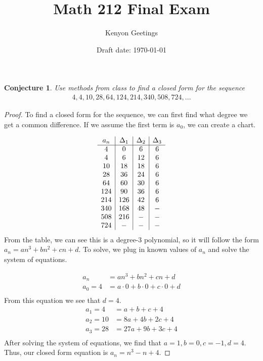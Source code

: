 \documentclass[11pt,titlepage]{article}		%
\title{\sc Math 212 Final Exam}
\author{Kenyon Geetings}
\date{Draft date: \today}
\newtheorem{conjecture}[theorem]{Conjecture}
\theoremstyle{definition}
\theoremstyle{theorem}
\begin{document}
\maketitle



\clearpage

\begin{conjecture}
	Use methods from class to find a closed form for the sequence
	\begin{align*}
    4,4,10,28,64,124,214,340,508,724,...
    \end{align*}
\end{conjecture}

\begin{proof}
To find a closed form for the sequence, we can first find what degree we get a common difference. If we assume the first term is $a_0$, we can create a chart.

\begin{displaymath}
\begin{array}{c | c | c | c}
a_{n} & \Delta _{1} & \Delta _{2} & \Delta _{3} \\
\hline
4 & 0 & 6 & 6\\
4 & 6 & 12 & 6\\
10 & 18 & 18 & 6\\
28 & 36 & 24 & 6\\
64 & 60 & 30 & 6\\
124 &90 & 36 & 6\\
214 & 126 & 42 & 6\\
340 & 168 & 48 & -\\
508 & 216 & -& -\\
724 & - &-  &- 
\end{array}
\end{displaymath}
From the table, we can see this is a degree-3 polynomial, so it will follow the form $a_n = an^3 + bn^2 + cn + d$. To solve, we plug in known values of $a_n$ and solve the system of equations.

\begin{align*}
a_n &= an^3 + bn^2 + cn + d\\
a_0 = 4 &= a\cdot0 + b\cdot0 + c\cdot0 + d\\
\end{align*}
From this equation we see that $d=4$.
\begin{align*}
a_1 = 4 &= a + b + c + 4\\
a_2 = 10 &= 8a + 4b + 2c + 4\\
a_3 = 28 &= 27a + 9b + 3c + 4\\
\end{align*}
After solving the system of equations, we find that $a=1,b=0,c=-1,d=4$. Thus, our closed form equation is $a_n = n^3 -n + 4$.
\end{proof}
\end{document}
